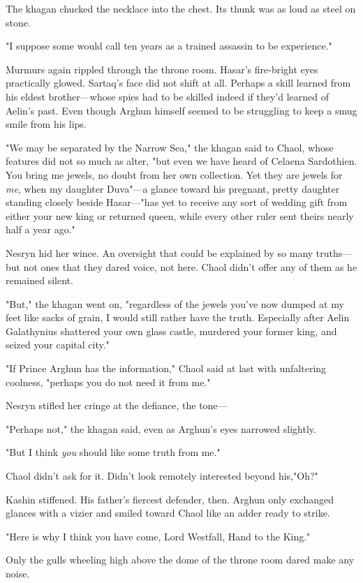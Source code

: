 The khagan chucked the necklace into the chest.
Its thunk was as loud as steel on stone.

"I suppose some would call ten years as a trained assassin to be experience."

Murmurs again rippled through the throne room.
Hasar's fire-bright eyes practically glowed.
Sartaq's face did not shift at all.
Perhaps a skill learned from his eldest brother---whose spies had to be skilled indeed if they'd learned of Aelin's past.
Even though Arghun himself seemed to be struggling to keep a smug smile from his lips.

"We may be separated by the Narrow Sea," the khagan said to Chaol, whose features did not so much as alter, "but even we have heard of Celaena Sardothien.
You bring me jewels, no doubt from her own collection.
Yet they are jewels for \emph{me}, when my daughter Duva"---a glance toward his pregnant, pretty daughter standing closely beside Hasar---"has yet to receive any sort of wedding gift from either your new king or returned queen, while every other ruler sent theirs nearly half a year ago."

Nesryn hid her wince.
An oversight that could be explained by so many truths---but not ones that they dared voice, not here.
Chaol didn't offer any of them as he remained silent.

"But," the khagan went on, "regardless of the jewels you've now dumped at my feet like sacks of grain, I would still rather have the truth.
Especially after Aelin Galathynius shattered your own glass castle, murdered your former king, and seized your capital city."

"If Prince Arghun has the information," Chaol said at last with unfaltering coolness, "perhaps you do not need it from me."

Nesryn stifled her cringe at the defiance, the tone---

"Perhaps not," the khagan said, even as Arghun's eyes narrowed slightly.

"But I think \emph{you} should like some truth from me."

Chaol didn't ask for it.
Didn't look remotely interested beyond his,"Oh?"

Kashin stiffened.
His father's fiercest defender, then.
Arghun only exchanged glances with a vizier and smiled toward Chaol like an adder ready to strike.

"Here is why I think you have come, Lord Westfall, Hand to the King."

Only the gulls wheeling high above the dome of the throne room dared make any noise.

